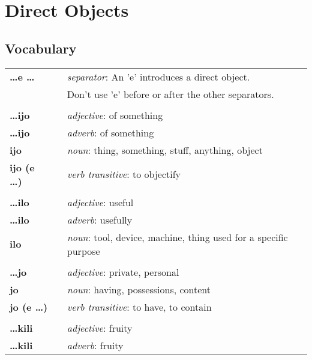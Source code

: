 \section{Direct Objects}
%
\subsection*{Vocabulary}
%
\begin{supertabular}{p{2,5cm}|ll}
%
\textbf{\dots e \dots} && \textit{separator}: An 'e' introduces a direct object. \\ && Don't use 'e' before or after the other separators. \\ %
 && \\ %
%
\textbf{\dots ijo} && \textit{adjective}: of something \\ %
\textbf{\dots ijo} && \textit{adverb}: of something \\ %
\textbf{ijo} && \textit{noun}: thing, something, stuff, anything, object \\ %
\textbf{ijo (e \dots)} && \textit{verb transitive}: to objectify \\ %
 && \\ %
%
\textbf{\dots ilo} && \textit{adjective}: useful \\ %
\textbf{\dots ilo} && \textit{adverb}: usefully \\ %
\textbf{ilo} && \textit{noun}: tool, device, machine, thing used for a specific purpose \\ %
 && \\ %
%
\textbf{\dots jo} && \textit{adjective}: private, personal \\ %
\textbf{jo} && \textit{noun}: having, possessions, content \\ %
\textbf{jo (e \dots)} && \textit{verb transitive}: to have, to contain \\ %
 && \\ %
%
\textbf{\dots kili} && \textit{adjective}: fruity \\ %
\textbf{\dots kili} && \textit{adverb}: fruity \\ %

\end{supertabular}
